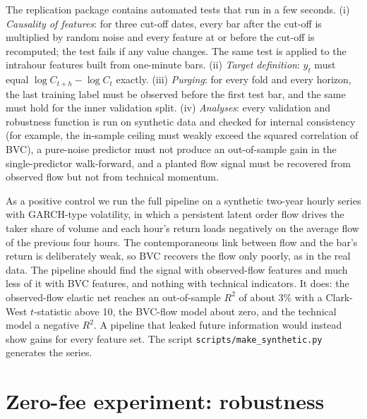 The replication package contains automated tests that run in a few seconds.
(i) \emph{Causality of features}: for three cut-off dates, every bar after the cut-off is multiplied
by random noise and every feature at or before the cut-off is recomputed; the test fails if any
value changes. The same test is applied to the intrahour features built from one-minute bars.
(ii) \emph{Target definition}: $y_t$ must equal $\log C_{t+h}-\log C_t$ exactly.
(iii) \emph{Purging}: for every fold and every horizon, the last training label must be observed
before the first test bar, and the same must hold for the inner validation split.
(iv) \emph{Analyses}: every validation and robustness function is run on synthetic data and checked
for internal consistency (for example, the in-sample ceiling must weakly exceed the squared
correlation of BVC), a pure-noise predictor must not produce an out-of-sample gain in the
single-predictor walk-forward, and a planted flow signal must be recovered from observed flow but
not from technical momentum.

As a positive control we run the full pipeline on a synthetic two-year hourly series with GARCH-type
volatility, in which a persistent latent order flow drives the taker share of volume and each hour's
return loads negatively on the average flow of the previous four hours. The contemporaneous link
between flow and the bar's return is deliberately weak, so BVC recovers the flow only poorly, as in
the real data. The pipeline should find the
signal with observed-flow features and much less of it with BVC features, and nothing with technical
indicators. It does: the observed-flow elastic net reaches an out-of-sample $R^2$ of about 3\% with a
Clark-West $t$-statistic above 10, the BVC-flow model about zero, and the technical model a negative
$R^2$. A pipeline that leaked future information would instead show gains for every feature set. The
script \texttt{scripts/make\_synthetic.py} generates the series.

\section{Zero-fee experiment: robustness}\label{app:fee}

\begin{table}[H]
\centering\caption{Effects of removing and restoring fees: alternative specifications}\label{tab:feerobust}
\resizebox{\textwidth}{!}{}
\end{table}

